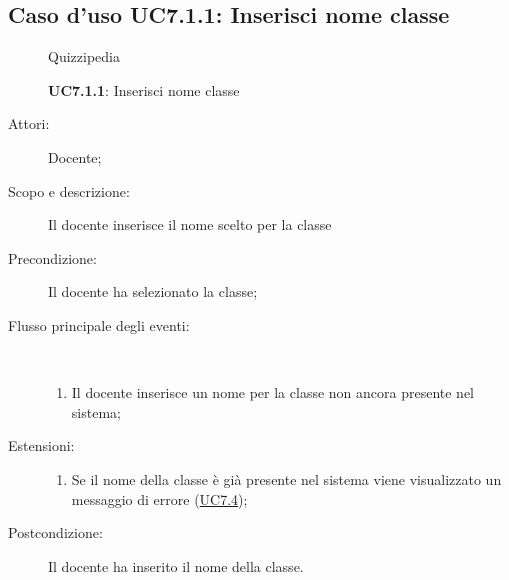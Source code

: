 \subsection{Caso d'uso UC7.1.1: Inserisci nome classe}
	\begin{figure}[H]
		\centering
		\begin{resizedtikzpicture}{\textwidth}
		\begin{umlsystem}[x=0, fill=lightgray!20]{Quizzipedia}
		\end{umlsystem}
		\end{resizedtikzpicture}
		\caption{\textbf{UC7.1.1}: Inserisci nome classe}
		\label{UC7.1.1}
	\end{figure}
\begin{description}
\item[Attori:] Docente;
\item[Scopo e descrizione:] Il docente inserisce il nome scelto per la classe
      \item[Precondizione:] Il docente ha selezionato la classe;

        \item[Flusso principale degli eventi:] \ 
 \begin{enumerate}
          \item Il docente inserisce un nome per la classe non ancora presente nel sistema;

      \end{enumerate}
    \item[Estensioni:]
      \begin{enumerate}
          \item Se il nome della classe è già presente nel sistema viene visualizzato un messaggio di errore (\hyperlink{UC7.4}{UC7.4});

      \end{enumerate}
    \item[Postcondizione:] Il docente ha inserito il nome della classe.
  \end{description}
\hypertarget{UC7.1.2}{}

